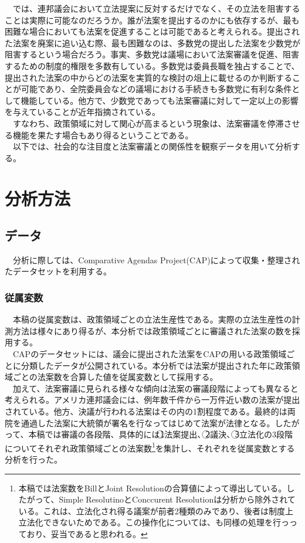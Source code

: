\documentclass[here]{article}
\begin{document}
　では、連邦議会において立法提案に反対するだけでなく、その立法を阻害することは実際に可能なのだろうか。誰が法案を提出するのかにも依存するが、最も困難な場合においても法案を促進することは可能であると考えられる。提出された法案を廃案に追い込む際、最も困難なのは、多数党の提出した法案を少数党が阻害するという場合だろう。事実、多数党は議場において法案審議を促進、阻害するための制度的権限を多数有している。\citep*{Aldrich1995-xf,Cox2005-pn,Cox2007-xq,Sinclair2016-kh}多数党は委員長職を独占することで、提出された法案の中からどの法案を実質的な検討の俎上に載せるのか判断することが可能であり、全院委員会などの議場における手続きも多数党に有利な条件として機能している。他方で、少数党であっても法案審議に対して一定以上の影響を与えていることが近年指摘されている。\\
　すなわち、政策領域に対して関心が高まるという現象は、法案審議を停滞させる機能を果たす場合もあり得るということである。\\
　以下では、社会的な注目度と法案審議との関係性を観察データを用いて分析する。\\

\section{分析方法}
\subsection{データ}
　分析に際しては、Comparative Agendas Project(CAP)によって収集・整理されたデータセットを利用する。\\

\subsubsection{従属変数}
　本稿の従属変数は、政策領域ごとの立法生産性である。実際の立法生産性の計測方法は様々にあり得るが、本分析では政策領域ごとに審議された法案の数を採用する。\\
　CAPのデータセットには、議会に提出された法案をCAPの用いる政策領域ごとに分類したデータが公開されている。本分析では法案が提出された年に政策領域ごとの法案数を合算した値を従属変数として採用する。\\
　加えて、法案審議に見られる様々な傾向は法案の審議段階によっても異なると考えられる。アメリカ連邦議会には、例年数千件から一万件近い数の法案が提出されている。他方、決議が行われる法案はその内の1割程度である。最終的は両院を通過した法案に大統領が署名を行なってはじめて法案が法律となる。したがって、本稿では審議の各段階、具体的には\textcircled{\scriptsize 1}法案提出、\textcircled{\scriptsize 2}議決、\textcircled{\scriptsize 3}立法化の3段階についてそれぞれ政策領域ごとの法案数\footnote{本稿では法案数をBillとJoint Resolutionの合算値によって導出している。したがって、Simple ResolutinoとConccurent Resolutionは分析から除外されている。これは、立法化され得る議案が前者2種類のみであり、後者は制度上立法化できないためである。\citep*{US_Senate2020-xq}この操作化については、\citet*{Adler2013-ay}も同様の処理を行っっており、妥当であると思われる。}を集計し、それぞれを従属変数とする分析を行った。\\
\end{document}
